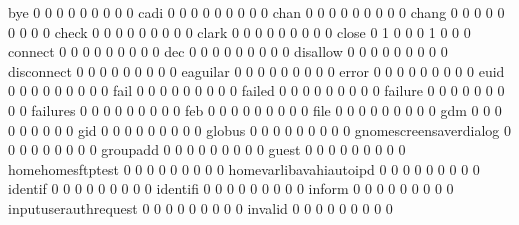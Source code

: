 \documentclass[compress,8pt]{beamer}
\begin{document}
\begin{frame}
\begin{Schunk}
  bye                                        0   0   0   0   0   0   0   0   0
  cadi                                       0   0   0   0   0   0   0   0   0
  chan                                       0   0   0   0   0   0   0   0   0
  chang                                      0   0   0   0   0   0   0   0   0
  check                                      0   0   0   0   0   0   0   0   0
  clark                                      0   0   0   0   0   0   0   0   0
  close                                      0   1   0   0   0   1   0   0   0
  connect                                    0   0   0   0   0   0   0   0   0
  dec                                        0   0   0   0   0   0   0   0   0
  disallow                                   0   0   0   0   0   0   0   0   0
  disconnect                                 0   0   0   0   0   0   0   0   0
  eaguilar                                   0   0   0   0   0   0   0   0   0
  error                                      0   0   0   0   0   0   0   0   0
  euid                                       0   0   0   0   0   0   0   0   0
  fail                                       0   0   0   0   0   0   0   0   0
  failed                                     0   0   0   0   0   0   0   0   0
  failure                                    0   0   0   0   0   0   0   0   0
  failures                                   0   0   0   0   0   0   0   0   0
  feb                                        0   0   0   0   0   0   0   0   0
  file                                       0   0   0   0   0   0   0   0   0
  gdm                                        0   0   0   0   0   0   0   0   0
  gid                                        0   0   0   0   0   0   0   0   0
  globus                                     0   0   0   0   0   0   0   0   0
  gnomescreensaverdialog                     0   0   0   0   0   0   0   0   0
  groupadd                                   0   0   0   0   0   0   0   0   0
  guest                                      0   0   0   0   0   0   0   0   0
  homehomesftptest                           0   0   0   0   0   0   0   0   0
  homevarlibavahiautoipd                     0   0   0   0   0   0   0   0   0
  identif                                    0   0   0   0   0   0   0   0   0
  identifi                                   0   0   0   0   0   0   0   0   0
  inform                                     0   0   0   0   0   0   0   0   0
  inputuserauthrequest                       0   0   0   0   0   0   0   0   0
  invalid                                    0   0   0   0   0   0   0   0   0

\end{Schunk}
\end{frame}
\end{document}
